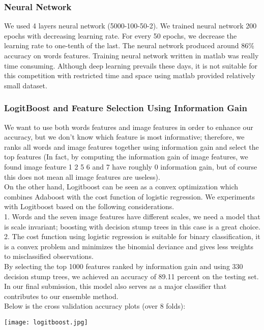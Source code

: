 \subsubsection{Neural Network}
We used 4 layers neural network (5000-100-50-2). We trained neural network 200 epochs with decreasing learning rate. For every 50 epochs, we decrease the learning rate to one-tenth of the last. The neural network produced around 86\% accuracy on words features. Training neural network written in matlab was really time consuming. Although deep learning prevails these days, it is not suitable for this competition with restricted time and space using matlab provided relatively small dataset. 
\subsubsection{LogitBoost and Feature Selection Using Information Gain}
 We want to use both words features and image features in order to enhance our accuracy, but we don't know which feature is most informative; therefore, we ranks all words and image features together using information gain and select the top features (In fact, by computing the information gain of image features, we found image feature 1 2 5 6 and 7 have roughly 0 information gain, but of course this does not mean all image features are useless).\\
On the other hand, Logitboost can be seen as a convex optimization which combines Adaboost with the cost function of logistic regression. We experiments with Logitboost based on the following considerations.\\
1. Words and the seven image features have different scales, we need a model that is scale invariant; boosting with decision stump trees in this case is a great choice.\\
2. The cost function using logistic regression is suitable for binary classification, it is a convex problem and minimizes the binomial deviance and gives less weights to misclassified observations.\\
By selecting the top 1000 features ranked by information gain and using 330 decision stump trees, we achieved an accuracy of 89.11 percent on the testing set.\\
In our final submission, this model also serves as a major classifier that contributes to our ensemble method.\\
Below is the cross validation accuracy plots (over 8 folds):\\
\begin{center}
\texttt{[image: logitboost.jpg]}
\end{center}
